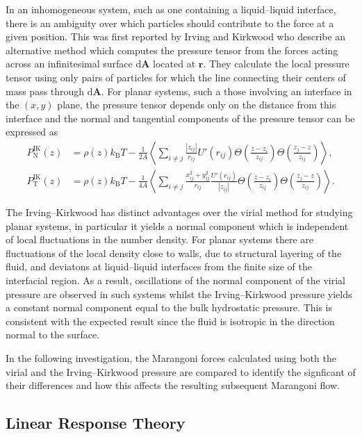 In an inhomogeneous system, such as one containing a liquid--liquid interface, there is an ambiguity over which particles should contribute to the force at a given position.\cite{MolTheoryCap,VarnikBinder,Rowlinson1982}
This was first reported by Irving and Kirkwood\cite{IrvingKirkwood1949,IrvingKirkwood1950} who describe an alternative method which computes the pressure tensor from the forces acting across an infinitesimal surface $\mathrm{d}\mathbf{A}$ located at $\mathbf{r}$.
They calculate the local pressure tensor using only pairs of particles for which the line connecting their centers of mass pass through $\mathrm{d}\mathbf{A}$.
For planar systems, such a those involving an interface in the $(x,y)$ plane, the pressure tensor depends only on the distance from this interface and the normal and tangential components of the pressure tensor can be expressed as
\begin{align}
\label{IKpressureN}
P_{\mathrm{N}}^{\mathrm{IK}}(z) &= \rho(z)k_{\mathrm{B}}T-\frac{1}{2A} \left< \sum_{i \neq j} \frac{|z_{ij}|}{r_{ij}} U'(r_{ij}) \Theta \left( \frac{z-z_{i}}{z_{ij}}\right) \Theta \left( \frac{z_{j} - z}{z_{ij}} \right) \right>,\\
\label{IKpressureT}
P_{\mathrm{T}}^{\mathrm{IK}}(z) &= \rho(z)k_{\mathrm{B}}T-\frac{1}{4A} \left< \sum_{i \neq j} \frac{x^{2}_{ij} + y^{2}_{ij}}{r_{ij}} \frac{U'(r_{ij})}{|z_{ij}|} \Theta \left( \frac{z-z_{i}}{z_{ij}}\right) \Theta \left( \frac{z_{j} - z}{z_{ij}} \right) \right>.
\end{align}

The Irving--Kirkwood has distinct advantages over the virial method for studying planar systems, in particular it yields a normal component which is independent of local fluctuations in the number density.
For planar systems there are fluctuations of the local density close to walls, due to structural layering of the fluid, and deviatons at liquid--liquid interfaces from the finite size of the interfacial region.
As a result, oscillations of the normal component of the virial pressure are observed in such systems\cite{VarnikBinder} whilst the Irving--Kirkwood pressure yields a constant normal component equal to the bulk hydrostatic pressure.
This is consistent with the expected result since the fluid is isotropic in the direction normal to the surface.

In the following investigation, the Marangoni forces calculated using both the virial and the Irving--Kirkwood pressure are compared to identify the signficant of their differences  and how this affects the resulting subsequent Marangoni flow.

\subsection{Linear Response Theory}
